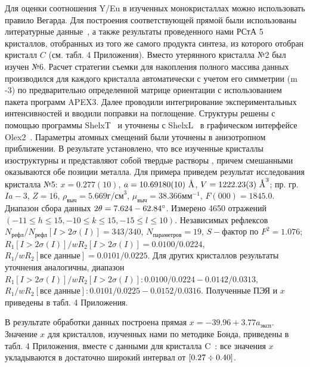 Для оценки соотношения Y/Eu в изученных монокристаллах \YEu{} можно использовать правило Вегарда.
Для построения соответствующей прямой были использованы литературные данные~\cite{Swanson:1954,Morris:1984,Nikolaev:2023}, а также результаты проведенного нами РСтА 5 кристаллов, отобранных из того же самого продукта синтеза, из которого отобран кристалл $C$ (см. табл. 4 Приложения).
Вместо утерянного кристалла №2 был изучен №6.
Расчет стратегии съемки для накопления полного массива данных производился для каждого кристалла автоматически с учетом его симметрии \hkl(m -3) по предварительно определенной матрице ориентации с использованием пакета программ APEX3.
Далее проводили интегрирование экспериментальных интенсивностей и вводили поправки на поглощение.
Структуры решены с помощью программы ShelxT~\cite{Sheldrick:2015:shelxt} и уточнены с ShelxL~\cite{Sheldrick:2015:shelxl} в графическом интерфейсе Olex2~\cite{Dolomanov:2009}.
Параметры атомных смещений были уточнены в анизотропном приближении.
В результате установлено, что все изученные кристаллы изоструктурны и представляют собой твердые растворы \YEu{}, причем смешанными оказываются обе позиции металла.
Для примера приведем результат исследования кристалла №5: $x = 0.277(10)$, $a = 10.69180(10)\ \text{\AA}$, $V = 1222.23(3)\ \text{\AA}^3$; пр. гр. $Ia-3$, $Z = 16$, $\rho_\text{выч} = 5.669\unit{г/см}^3$, $\mu_\text{выч} = 38.366\unit{мм}^{-1}$, $F(000) = 1845.0$.
Диапазон сбора данных $2\theta = 7.624-62.84^\circ$.
Измерено 4650 отражений $(-11 \leq h \leq 15, -10 \leq k \leq 15, -15 \leq l \leq 10)$.
Независимых рефлексов $N_\text{рефл}/N_\text{рефл} [I > 2\sigma (I)] = 343/340$, $N_\text{параметров} = 19$, $S-\text{фактор}$ по $F^2 = 1.076$; $R_1 [I > 2\sigma (I)]/wR_2 [I > 2\sigma (I)] = 0.0100/0.0224$, $R_1/wR_2 [\text{все данные}] = 0.0101/0.0225$.
Для других кристаллов результаты уточнения аналогичны, диапазон $R_1 [I > 2\sigma (I)]/wR_2 [I > 2\sigma (I)]: 0.0100/0.0224 - 0.0142/0.0313$, $R_1/wR_2 [\text{все данные}]: 0.0101/0.0225 - 0.0152/0.0316$.
Полученные ПЭЯ и $x$ приведены в табл. 4 Приложения.

В результате обработки данных построена прямая $x = -39.96 + 3.77 a_\text{эксп}$.
Значение $x$ для кристаллов, изученных нами по методике Бонда, приведены в табл. 4 Приложения, вместе с данными для кристалла C~\cite{Nikolaev:2023}: все значения $x$ укладываются в достаточно широкий интервал от $[0.27\div0.40]$.
